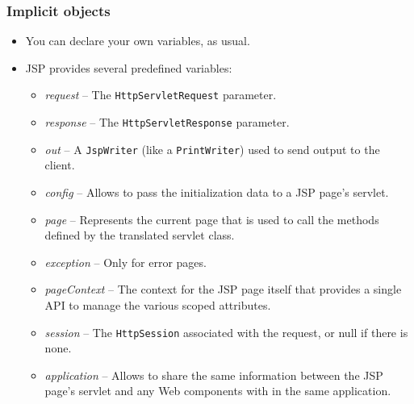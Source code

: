 \documentclass[10pt,xcolor=pdflatex]{beamer}
\begin{document}
\begin{frame}\frametitle{Implicit objects}
	\begin{itemize}
    	\item You can declare your own variables, as usual.
		\item JSP provides several predefined variables:
		  \begin{itemize}
        	\item \emph{request} --  The \texttt{HttpServletRequest} parameter.
			\item \emph{response} --  The \texttt{HttpServletResponse} parameter.
			\item \emph{out} --  A \texttt{JspWriter} (like a \texttt{PrintWriter}) used to send output to the client.
			\item \emph{config} -- Allows to pass the initialization data to a JSP page's servlet.
			\item \emph{page} -- Represents the current page that is used to call the methods defined by the translated servlet class.
			\item \emph{exception} -- Only for error pages.
			\item \emph{pageContext} --  The context for the JSP page itself that provides a single API to manage the various scoped attributes.
			\item \emph{session} --  The \texttt{HttpSession} associated with the request, or null if there is none.
			\item \emph{application} --  Allows to share the same information between the JSP page's servlet and any Web components with in the same application.
          \end{itemize}
    \end{itemize}
\end{frame}
\end{document}
